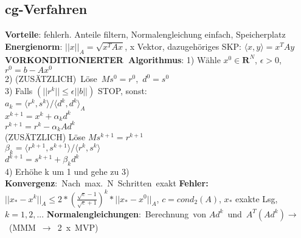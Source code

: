 \subsection{cg-Verfahren}
\textbf{Vorteile}: fehlerh. Anteile filtern, Normalengleichung einfach, Speicherplatz\\
\textbf{Energienorm}: $||x||_A = \sqrt{x^TAx}$, x Vektor, dazugehöriges SKP: $\langle x , y \rangle = x^TAy$\\
\mbox{\textbf{VORKONDITIONIERTER Algorithmus}:}
1) Wähle $x^0 \in \mathbf{R}^N$, $\epsilon > 0$, $r^0 = b - Ax^0$\\
2) \mbox{(ZUSÄTZLICH) Löse $Ms^0 = r^0$, $d^0 = s^0$}\\
3) Falls $(||r^k|| \leq \epsilon||b||)$ STOP, sonst:\\
\hspace*{5mm}$a_k = \langle r^k, s^k\rangle / \langle d^k, d^k\rangle_A$\\
\hspace*{5mm}$x^{k+1} = x^k + \alpha_kd^k$\\
\hspace*{5mm}$r^{k+1} = r^k - \alpha_kAd^k$\\
\hspace*{5mm}(ZUSÄTZLICH) Löse $Ms^{k+1} = r^{k+1}$\\
\hspace*{5mm}$\beta_k = \langle r^{k+1}, s^{k+1}\rangle / \langle r^k, s^k\rangle $\\
\hspace*{5mm}$d^{k+1} = s^{k+1} + \beta_kd^k$\\
4) Erhöhe k um 1 und gehe zu 3)\\
\mbox{\textbf{Konvergenz}: Nach max. N Schritten exakt}
\textbf{Fehler:} $||x_{*} - x^k||_A \leq 2*(\frac{\sqrt{c} - 1}{\sqrt{c} + 1})^k *||x_{*} - x^0||_A$, $c = cond_2(A)$, $x_{*}$ exakte Lsg, $k = 1,2, ...$
\mbox{\textbf{Normalengleichungen}: Berechnung von} \mbox{$Ad^k$ und $A^T(Ad^k) \rightarrow$ (MMM $\rightarrow$ 2 x MVP)}
